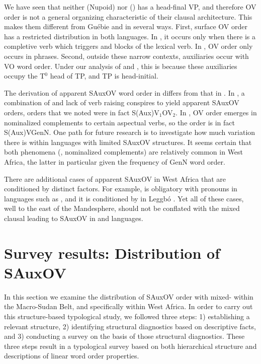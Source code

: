\documentclass[output=paper]{LSP/langsci}
\begin{document}
We have seen that neither  (Nupoid) nor  () has a head-final VP, and therefore OV order is not a general organizing characteristic of their clausal architecture. This makes them different from Gu\'ebie and  in several ways. First, surface OV order has a restricted distribution in both languages. In , it occurs only when there is a completive verb which triggers  and blocks  of the lexical verb. In , OV order only occurs in  phrases. Second, outside these narrow contexts, auxiliaries occur with VO word order. Under our analysis of  and , this is because these auxiliaries occupy the T$^0$ head of TP, and TP is head-initial.

The derivation of apparent SAuxOV word order in  differs from that in . In , a combination of  and lack of verb raising conspires to yield apparent SAuxOV orders, orders that we noted were in fact S(Aux)V$_1$OV$_2$. In , OV order emerges in nominalized complements to certain aspectual verbs, so the  order is in fact S(Aux)VGenN. One path for future research is to investigate how much variation there is within languages with limited SAuxOV structures. It seems certain that both phenomena (, nominalized complements) are relatively common in West Africa, the latter in particular given the frequency of GenN word order.

There are additional cases of apparent SAuxOV in West Africa that are conditioned by distinct factors. For example,  is obligatory with pronouns in  languages such as  \citep{ikoro96}, and it is conditioned by  in Leggb\'o \citep{good07}. Yet all of these cases, well to the east of the Mandesphere, should not be conflated with the mixed clausal  leading to SAuxOV in  and  languages.


\section{Survey results: Distribution of SAuxOV}\label{sec:distribution}

In this section we examine the distribution of SAuxOV order with mixed- within the Macro-Sudan Belt, and specifically within West Africa. In order to carry out this structure-based typological study, we followed three steps: 1) establishing a relevant structure, 2) identifying structural diagnostics based on descriptive facts, and 3) conducting a survey on the basis of those structural diagnostics. These three steps result in a typological survey based on both hierarchical structure and descriptions of linear word order properties. 
\end{document}

